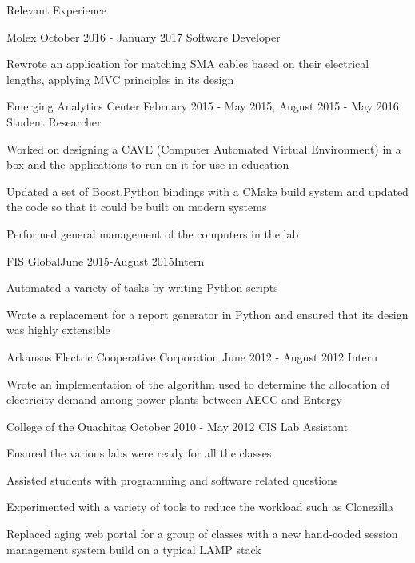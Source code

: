 \documentclass{resume}
\begin{document}
\begin{rSection}{Relevant Experience}
  \begin{rSubsection}
        {Molex}
        {October 2016 - January 2017}
        {Software Developer}{}{}
    \item Rewrote an application for matching SMA cables based on their
          electrical lengths, applying MVC principles in its design

  \end{rSubsection}
  \begin{rSubsection}
        {Emerging Analytics Center}
        {February 2015 - May 2015, August 2015 - May 2016}
        {Student Researcher}{}{}
    \item Worked on designing a CAVE (Computer Automated Virtual Environment)
          in a box and the applications to run on it for use in education
    \item Updated a set of Boost.Python bindings with a CMake build system
          and updated the code so that it could be built on modern systems
    \item Performed general management of the computers in the lab
  \end{rSubsection}

  \begin{rSubsection}{FIS Global}{June 2015-August 2015}{Intern}{}{}
    \item Automated a variety of tasks by writing Python scripts
    \item Wrote a replacement for a report generator in Python and ensured that
          its design was highly extensible
  \end{rSubsection}

  \begin{rSubsection}
        {Arkansas Electric Cooperative Corporation}
        {June 2012 - August 2012}
        {Intern}{}{}
    \item Wrote an implementation of the algorithm used to determine the
          allocation of electricity demand among power plants between AECC
          and Entergy
  \end{rSubsection}

  \begin{rSubsection}
        {College of the Ouachitas}
        {October 2010 - May 2012}
        {CIS Lab Assistant}{}{}
    \item Ensured the various labs were ready for all the classes
    \item Assisted students with programming and software related questions
    \item Experimented with a variety of tools to reduce the workload such
          as Clonezilla
    \item Replaced aging web portal for a group of classes with a new
          hand-coded session management system build on a typical LAMP stack
  \end{rSubsection}
\end{rSection}
\end{document}
